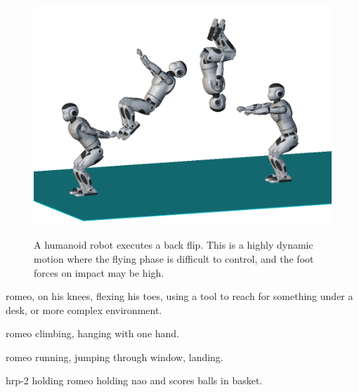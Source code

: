 \begin{figure}
  \centering
      {\includegraphics[width = 0.8\linewidth]
        {src/chap4-conclusion/romeo-back-flip.png}}
      \caption{A humanoid robot executes a back flip. This is a highly
        dynamic motion where the flying phase is difficult to control,
        and the foot forces on impact may be high.}
      \label{fig:chap4-romeo-back-flip}
\end{figure}

romeo, on his knees, flexing his toes, using a tool to reach for
something under a desk, or more complex environment.

romeo climbing, hanging with one hand.

romeo running, jumping through window, landing.

hrp-2 holding romeo holding nao and scores balls in basket.

